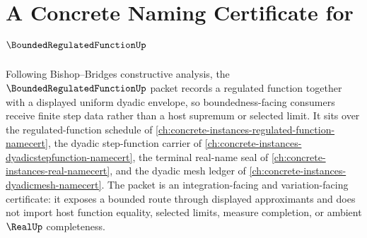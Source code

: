 \chapter{A Concrete Naming Certificate for $\BoundedRegulatedFunctionUp$}
\label{ch:concrete-instances-bounded-regulated-function-namecert}

Following Bishop--Bridges constructive analysis, the $\BoundedRegulatedFunctionUp$ packet records a regulated function together with a displayed uniform dyadic envelope, so boundedness-facing consumers receive finite step data rather than a host supremum or selected limit. It sits over the regulated-function schedule of \autoref{ch:concrete-instances-regulated-function-namecert}, the dyadic step-function carrier of \autoref{ch:concrete-instances-dyadicstepfunction-namecert}, the terminal real-name seal of \autoref{ch:concrete-instances-real-namecert}, and the dyadic mesh ledger of \autoref{ch:concrete-instances-dyadicmesh-namecert}. The packet is an integration-facing and variation-facing certificate: it exposes a bounded route through displayed approximants and does not import host function equality, selected limits, measure completion, or ambient $\RealUp$ completeness.

